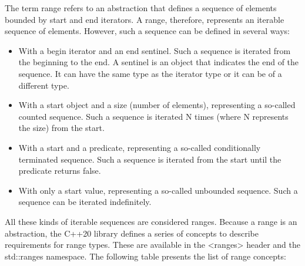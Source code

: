 
The term range refers to an abstraction that defines a sequence of elements bounded by start and end iterators. A range, therefore, represents an iterable sequence of elements. However, such a sequence can be defined in several ways:

\begin{itemize}
\item
With a begin iterator and an end sentinel. Such a sequence is iterated from the beginning to the end. A sentinel is an object that indicates the end of the sequence. It can have the same type as the iterator type or it can be of a different type.

\item
With a start object and a size (number of elements), representing a so-called counted sequence. Such a sequence is iterated N times (where N represents the size) from the start.

\item
With a start and a predicate, representing a so-called conditionally terminated sequence. Such a sequence is iterated from the start until the predicate returns false.

\item
With only a start value, representing a so-called unbounded sequence. Such a sequence can be iterated indefinitely.
\end{itemize}

All these kinds of iterable sequences are considered ranges. Because a range is an abstraction, the C++20 library defines a series of concepts to describe requirements for range types. These are available in the <ranges> header and the std::ranges namespace. The following table presents the list of range concepts:


